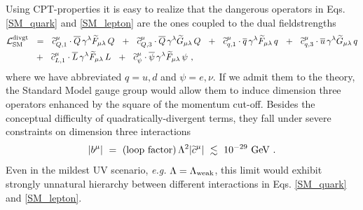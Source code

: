 \documentclass[12pt,preprintnumbers,nofootinbib]{revtex4}
\newcommand{\wt}{\widetilde}
\newcommand{\ov}{\overline}
\begin{document}
	Using CPT-properties it is easy to realize that the dangerous operators
	in Eqs. \eqref{SM_quark} and \eqref{SM_lepton} are the ones coupled to
	the dual fieldstrengths
\begin{align}
\label{SM_divgt}
\notag
	\mathcal{L}_{\rm SM}^{\rm divgt} & ~~=~~
	\wt{c}_{Q,1}^\mu \cdot
	\ov{Q}\, \gamma^\lambda \wt{F}_{\mu\lambda}\, Q 
	~~+~~
	\wt{c}_{Q,3}^\mu \cdot
	\ov{Q}\, \gamma^\lambda \wt{G}_{\mu\lambda}\, Q 
	~~+~~
	\wt{c}_{q,1}^\mu \cdot
	\ov{q}\, \gamma^\lambda \wt{F}_{\mu\lambda}\, q
	~~+~~ 
	\wt{c}_{q,3}^\mu \cdot
	\ov{u}\, \gamma^\lambda \wt{G}_{\mu\lambda}\, q
	\\
	&
	~~+~~ 
	\wt{c}_{L,1}^\mu \cdot
	\ov{L}\, \gamma^{\lambda} \wt{F}_{\mu\lambda}\, L
	~~+~~
	\wt{c}_{\psi}^\mu \cdot
	\ov{\psi}\, \gamma^{\lambda} \wt{F}_{\mu\lambda}\, \psi
	~,
\end{align}
	where we have abbreviated $ q = u, d $ and $ \psi = e, \nu $.
	If we admit them to the theory, the Standard Model gauge group
	would allow them to induce dimension three operators enhanced by the
	square of the momentum cut-off. 
	Besides the conceptual difficulty of quadratically-divergent terms,
	they fall under severe constraints on dimension three
	interactions
\cite{Gagnon:2004xh}
\begin{equation}
\label{limit_dim3}
	| b^\mu | ~=~ ({\rm loop\ factor})\, 
		\Lambda^2 | \wt{c}^\mu |  ~\lesssim~ 10^{-29}~{\rm GeV}~.
\end{equation}
	Even in the mildest UV scenario, {\it e.g.} $ \Lambda = \Lambda_{\rm weak} $,
	this limit would exhibit strongly unnatural hierarchy between different interactions
	in Eqs. \eqref{SM_quark} and \eqref{SM_lepton}. 
	
\end{document}
